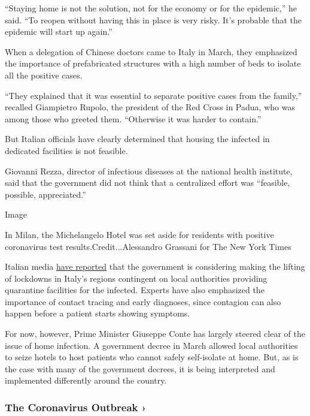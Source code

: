 ``Staying home is not the solution, not for the economy or for the
epidemic,'' he said. ``To reopen without having this in place is very
risky. It's probable that the epidemic will start up again.''

When a delegation of Chinese doctors came to Italy in March, they
emphasized the importance of prefabricated structures with a high number
of beds to isolate all the positive cases.

``They explained that it was essential to separate positive cases from
the family,'' recalled Giampietro Rupolo, the president of the Red Cross
in Padua, who was among those who greeted them. ``Otherwise it was
harder to contain.''

But Italian officials have clearly determined that housing the infected
in dedicated facilities is not feasible.

Giovanni Rezza, director of infectious diseases at the national health
institute, said that the government did not think that a centralized
effort was ``feasible, possible, appreciated.''

Image

In Milan, the Michelangelo Hotel was set aside for residents with
positive coronavirus test results.Credit...Alessandro Grassani for The
New York Times

Italian media
\href{https://www.corriere.it/cronache/20_aprile_20/coronavirus-fase-2-condizioni-le-regioni-che-vogliono-partire-prima-2a328f02-82bc-11ea-86b3-8aab0c7cf936.shtml}{have
reported} that the government is considering making the lifting of
lockdowns in Italy's regions contingent on local authorities providing
quarantine facilities for the infected. Experts have also emphasized the
importance of contact tracing and early diagnoses, since contagion can
also happen before a patient starts showing symptoms.

For now, however, Prime Minister Giuseppe Conte has largely steered
clear of the issue of home infection. A government decree in March
allowed local authorities to seize hotels to host patients who cannot
safely self-isolate at home. But, as is the case with many of the
government decrees, it is being interpreted and implemented differently
around the country.

\href{https://www.nytimes3xbfgragh.onion/news-event/coronavirus?action=click\&pgtype=Article\&state=default\&region=MAIN_CONTENT_3\&context=storylines_faq}{}

\hypertarget{the-coronavirus-outbreak-}{%
\subsubsection{The Coronavirus Outbreak
›}\label{the-coronavirus-outbreak-}}

